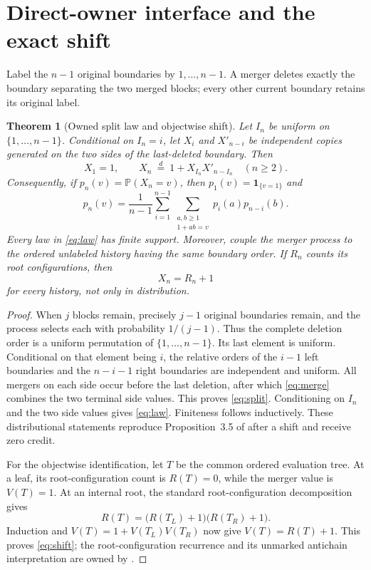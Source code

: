 \documentclass[10pt,a4paper]{amsart}
\newtheorem{theorem}{Theorem}[section]
\theoremstyle{definition}
\theoremstyle{remark}
\newcommand{\Pp}{\mathbb P}
\newcommand{\one}{\mathbf 1}
\begin{document}
\section{Direct-owner interface and the exact shift}

Label the $n-1$ original boundaries by $1,\ldots,n-1$.  A merger deletes
exactly the boundary separating the two merged blocks; every other current
boundary retains its original label.

\begin{theorem}[Owned split law and objectwise shift]\label{thm:split}
Let $I_n$ be uniform on $\{1,\ldots,n-1\}$.  Conditional on $I_n=i$, let
$X_i$ and $X'_{n-i}$ be independent copies generated on the two sides of the
last-deleted boundary.  Then
\begin{equation}\label{eq:split}
 X_1=1,\qquad
 X_n\ \overset d=\ 1+X_{I_n}X'_{n-I_n}\quad(n\geq2).
\end{equation}
Consequently, if $p_n(v)=\Pp(X_n=v)$, then $p_1(v)=\one_{\{v=1\}}$ and
\begin{equation}\label{eq:law}
 p_n(v)=\frac1{n-1}\sum_{i=1}^{n-1}
 \sum_{\substack{a,b\geq1\\1+ab=v}}p_i(a)p_{n-i}(b).
\end{equation}
Every law in \eqref{eq:law} has finite support.
Moreover, couple the merger process to the ordered unlabeled history having
the same boundary order.  If $R_n$ counts its root configurations, then
\begin{equation}\label{eq:shift}
                         X_n=R_n+1
\end{equation}
for every history, not only in distribution.
\end{theorem}

\begin{proof}
When $j$ blocks remain, precisely $j-1$ original boundaries remain, and the
process selects each with probability $1/(j-1)$.  Thus the complete deletion
order is a uniform permutation of $\{1,\ldots,n-1\}$.  Its last element is
uniform.  Conditional on that element being $i$, the relative orders of the
$i-1$ left boundaries and the $n-i-1$ right boundaries are independent and
uniform.  All mergers on each side occur before the last deletion, after
which \eqref{eq:merge} combines the two terminal side values.  This proves
\eqref{eq:split}.  Conditioning on $I_n$ and the two side values gives
\eqref{eq:law}.  Finiteness follows inductively.  These distributional
statements reproduce Proposition~3.5 of \citet{DisantoEtAl2022} after a
shift and receive zero credit.

For the objectwise identification, let $T$ be the common ordered evaluation
tree.  At a leaf, its root-configuration count is $R(T)=0$, while the merger
value is $V(T)=1$.  At an internal root, the standard root-configuration
decomposition gives
\[
 R(T)=\bigl(R(T_L)+1\bigr)\bigl(R(T_R)+1\bigr).
\]
Induction and $V(T)=1+V(T_L)V(T_R)$ now give $V(T)=R(T)+1$.  This proves
\eqref{eq:shift}; the root-configuration recurrence and its unmarked
antichain interpretation are owned by \citet{DisantoEtAl2022}.
\end{proof}
\end{document}
